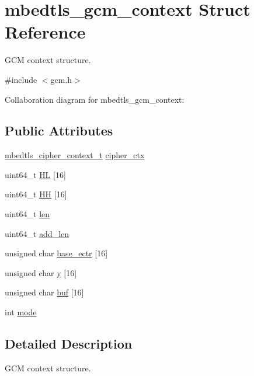 \hypertarget{structmbedtls__gcm__context}{}\section{mbedtls\+\_\+gcm\+\_\+context Struct Reference}
\label{structmbedtls__gcm__context}


G\+CM context structure.  




{\ttfamily \#include $<$gcm.\+h$>$}



Collaboration diagram for mbedtls\+\_\+gcm\+\_\+context\+:
\subsection*{Public Attributes}
\begin{DoxyCompactItemize}
\item 
\mbox{\hyperlink{structmbedtls__cipher__context__t}{mbedtls\+\_\+cipher\+\_\+context\+\_\+t}} \mbox{\hyperlink{structmbedtls__gcm__context_a3687a336bb05c025fb3861ca99cd945d}{cipher\+\_\+ctx}}
\item 
uint64\+\_\+t \mbox{\hyperlink{structmbedtls__gcm__context_af5731ab9002f0b1b913e66071e1138fc}{HL}} \mbox{[}16\mbox{]}
\item 
uint64\+\_\+t \mbox{\hyperlink{structmbedtls__gcm__context_a5935337c8028cc6fec0c5b9c7d0d4fd8}{HH}} \mbox{[}16\mbox{]}
\item 
uint64\+\_\+t \mbox{\hyperlink{structmbedtls__gcm__context_a7ca348b10a75f1ab46f7c5067c1ab6e7}{len}}
\item 
uint64\+\_\+t \mbox{\hyperlink{structmbedtls__gcm__context_aabc65285117dd4b35998a328648faa20}{add\+\_\+len}}
\item 
unsigned char \mbox{\hyperlink{structmbedtls__gcm__context_a0ad9a8fb116959218c800b0bc3caeaba}{base\+\_\+ectr}} \mbox{[}16\mbox{]}
\item 
unsigned char \mbox{\hyperlink{structmbedtls__gcm__context_a1a7eb48ed5911aeb2dd983da6cfd32bb}{y}} \mbox{[}16\mbox{]}
\item 
unsigned char \mbox{\hyperlink{structmbedtls__gcm__context_a772f2b1c947e9a3631f55b241c421aca}{buf}} \mbox{[}16\mbox{]}
\item 
int \mbox{\hyperlink{structmbedtls__gcm__context_a48f2fbbac9f7bb46411fea24ac433628}{mode}}
\end{DoxyCompactItemize}


\subsection{Detailed Description}
G\+CM context structure. 

